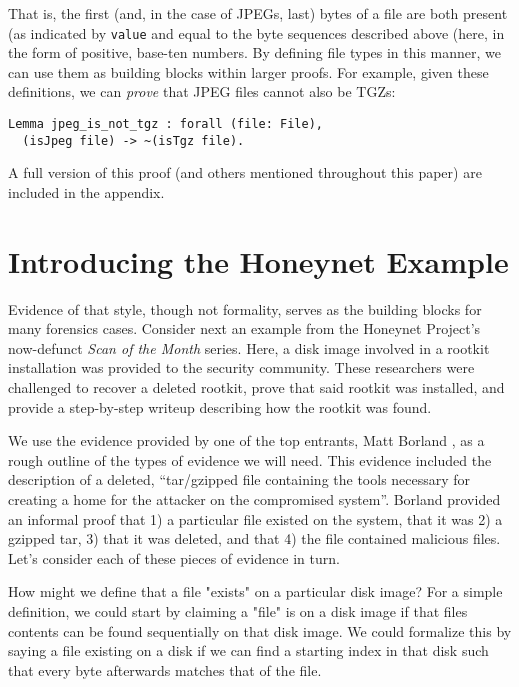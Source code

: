 \documentclass[nocopyrightspace]{sigplanconf}
\begin{document}
That is, the first (and, in the case of JPEGs, last) bytes of a file are both
present (as indicated by {\tt value} and equal to the byte sequences described
above (here, in the form of positive, base-ten numbers. By defining file types
in this manner, we can use them as building blocks within larger proofs. For
example, given these definitions, we can {\it prove} that JPEG files cannot
also be TGZs:

\begin{lstlisting}
Lemma jpeg_is_not_tgz : forall (file: File),
  (isJpeg file) -> ~(isTgz file).
\end{lstlisting}

A full version of this proof (and others mentioned throughout this paper) are
included in the appendix.

\section{Introducing the Honeynet Example}

Evidence of that style, though not formality, serves as the building blocks
for many forensics cases. Consider next an example \cite{honeynet-15} from the
Honeynet Project's now-defunct {\it Scan of the Month} series. Here, a disk
image involved in a rootkit installation was provided to the security
community. These researchers were challenged to recover a deleted rootkit,
prove that said rootkit was installed, and provide a step-by-step writeup
describing how the rootkit was found.

We use the evidence provided by one of the top entrants, Matt Borland
\cite{borland-honeynet}, as a rough outline of the types of evidence we will
need. This evidence included the description of a deleted, ``tar/gzipped file
containing the tools necessary for creating a home for the attacker on the
compromised system''. Borland provided an informal proof that 1) a particular
file existed on the system, that it was 2) a gzipped tar, 3) that it was
deleted, and that 4) the file contained malicious files. Let's consider each
of these pieces of evidence in turn.

How might we define that a file "exists" on a particular disk image? For a
simple definition, we could start by claiming a "file" is on a disk image if
that files contents can be found sequentially on that disk image. We could
formalize this by saying a file existing on a disk if we can find a starting
index in that disk such that every byte afterwards matches that of the file.
\end{document}
